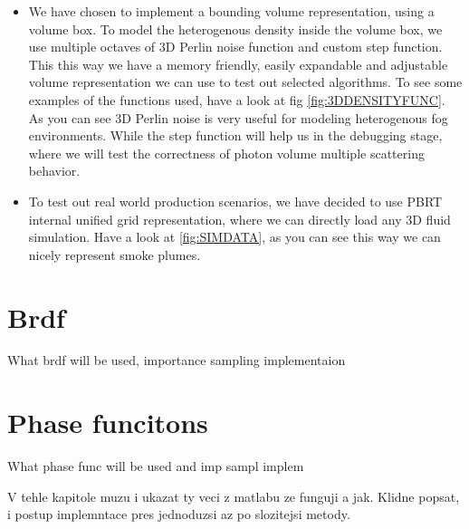 \begin{itemize}
\item {}
We have chosen to implement a bounding volume representation, using a volume box. To model the heterogenous density inside the volume box, we use multiple octaves of 3D Perlin noise function and custom step function. This this way we have a memory friendly, easily expandable and adjustable volume representation we can use to test out selected algorithms. To see some examples of the functions used, have a look at fig \ref{fig:3DDENSITYFUNC}. As you can see 3D Perlin noise is very useful for modeling heterogenous fog environments. While the step function will help us in the debugging stage, where we will test the correctness of photon volume multiple scattering behavior.

\item {}
To test out real world production scenarios, we have decided to use PBRT internal unified grid representation, where we can directly load any 3D fluid simulation. Have a look at \ref{fig:SIMDATA}, as you can see this way we can nicely represent smoke plumes.



\end{itemize}

\section{Brdf}
What brdf will be used, importance sampling implementaion

\section{Phase funcitons}
What phase func will be used and imp sampl implem 


V tehle kapitole muzu i ukazat ty veci z matlabu ze funguji a jak.
Klidne popsat, i postup implemntace pres jednoduzsi az po slozitejsi metody.




